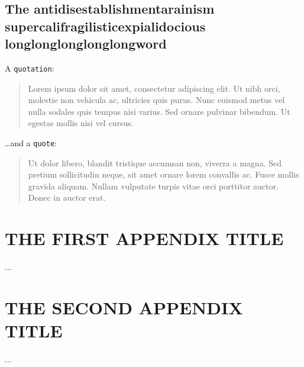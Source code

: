 \documentclass{umassthesis}          %
\begin{document}
\section{The antidisestablishmentarainism supercalifragilisticexpialidocious longlonglonglonglongword}

A \texttt{quotation}:

\begin{quotation}
Lorem ipsum dolor sit amet, consectetur adipiscing elit. Ut nibh orci, molestie
non vehicula ac, ultricies quis purus. Nunc euismod metus vel nulla sodales quis
tempus nisi varius. Sed ornare pulvinar bibendum. Ut egestas mollis nisi vel
cursus.
\end{quotation}

\dots and a \texttt{quote}:

\begin{quote}
Ut dolor libero, blandit tristique accumsan non, viverra a magna. Sed pretium
sollicitudin neque, sit amet ornare lorem convallis ac. Fusce mollis gravida
aliquam. Nullam vulputate turpis vitae orci porttitor auctor. Donec in auctor
erat.
\end{quote}




\appendix
\chapter{THE FIRST APPENDIX TITLE}
...
\chapter{THE SECOND APPENDIX TITLE}
...

\backmatter  %


\printbibliography
\end{document}
